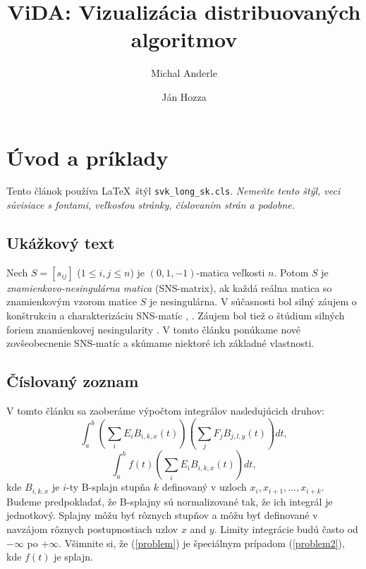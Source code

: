 \documentclass{svk_long_sk}
\begin{document}
\title{ViDA: Vizualizácia distribuovaných algoritmov}

\author{Michal Anderle
\and 
Ján Hozza
}




\maketitle




\section{Úvod a príklady}

Tento článok používa \LaTeX\ štýl {\tt svk\_long\_sk.cls}.
\emph{Nemeňte tento štýl, veci súvisiace s fontami,
veľkosťou stránky, číslovaním strán a podobne.}

\subsection{Ukážkový text}
Nech $S=[s_{ij}]$ ($1\leq i,j\leq n$) je $(0,1,-1)$-matica
veľkosti $n$. Potom $S$ je {\em znamienkovo-nesingulárna matica}
(SNS-matrix), ak každá reálna matica so znamienkovým vzorom
matice $S$ je nesingulárna. V súčasnosti bol silný záujem
o konštrukciu a charakterizáciu
SNS-matíc \cite{bs}, \cite{klm}. Záujem bol tiež o štúdium silných foriem
znamienkovej nesingularity \cite{djd}. V tomto článku ponúkame
nové zovšeobecnenie SNS-matíc a skúmame niektoré ich základné vlastnosti.
 
\subsection{Číslovaný zoznam}
V tomto článku sa zaoberáme výpočtom integrálov nasledujúcich druhov:
\begin{equation}
\int_a^b \left( \sum_i E_i B_{i,k,x}(t) \right)
         \left( \sum_j F_j B_{j,l,y}(t) \right) dt,\label{problem}
\end{equation}
\begin{equation}
\int_a^b f(t) \left( \sum_i E_i B_{i,k,x}(t) \right) dt,\label{problem2}
\end{equation}
kde $B_{i,k,x}$ je $i$-ty B-splajn stupňa $k$ definovaný v uzloch
$x_i, x_{i+1}, \ldots, x_{i+k}$.
Budeme predpokladať, že B-splajny sú normalizované tak, že ich integrál je 
jednotkový.
Splajny môžu byť rôznych stupňov a môžu byť definované v navzájom rôznych 
postupnostiach uzlov
$x$ and $y$.
Limity integrácie budú často
od $-\infty$ po
$+\infty$. Všimnite si, že (\ref{problem}) je špeciálnym prípadom
(\ref{problem2}),
kde $f(t)$ je splajn.
\end{document}
